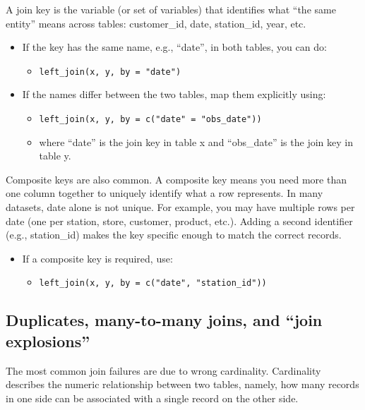 \documentclass[
  11pt,
]{article}
\providecommand{\tightlist}{%
  \setlength{\itemsep}{0pt}\setlength{\parskip}{0pt}}
\begin{document}
A join key is the variable (or set of variables) that identifies what
``the same entity'' means across tables: customer\_id, date,
station\_id, year, etc.

\begin{itemize}
\tightlist
\item
  If the key has the same name, e.g., ``date'', in both tables, you can
  do:

  \begin{itemize}
  \tightlist
  \item
    \texttt{left\_join(x,\ y,\ by\ =\ "date")}
  \end{itemize}
\item
  If the names differ between the two tables, map them explicitly using:

  \begin{itemize}
  \tightlist
  \item
    \texttt{left\_join(x,\ y,\ by\ =\ c("date"\ =\ "obs\_date"))}
  \item
    where ``date'' is the join key in table x and ``obs\_date'' is the
    join key in table y.
  \end{itemize}
\end{itemize}

Composite keys are also common. A composite key means you need more than
one column together to uniquely identify what a row represents. In many
datasets, date alone is not unique. For example, you may have multiple
rows per date (one per station, store, customer, product, etc.). Adding
a second identifier (e.g., station\_id) makes the key specific enough to
match the correct records.

\begin{itemize}
\tightlist
\item
  If a composite key is required, use:

  \begin{itemize}
  \tightlist
  \item
    \texttt{left\_join(x,\ y,\ by\ =\ c("date",\ "station\_id"))}
  \end{itemize}
\end{itemize}

\subsection{Duplicates, many-to-many joins, and ``join
explosions''}\label{duplicates-many-to-many-joins-and-join-explosions}

The most common join failures are due to wrong cardinality. Cardinality
describes the numeric relationship between two tables, namely, how many
records in one side can be associated with a single record on the other
side.
\end{document}

